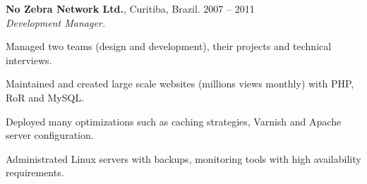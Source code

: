 \documentclass[margin,centered,10pt]{resume}
\begin{document}
\begin{resume}
    \textbf{No Zebra Network Ltd.}, Curitiba, Brazil.
    \hfill 2007 – 2011\\
    \textsl{Development Manager.}
    \vspace{-3mm}\\\vspace{-1mm}%
    \begin{list3}
    \item Managed two teams (design and development), their projects and technical interviews.
    \item Maintained and created large scale websites (millions views monthly) with PHP, RoR and MySQL. 
    \item Deployed many optimizations such as caching strategies, Varnish and Apache server configuration. 
    \item Administrated Linux servers with backups, monitoring tools with high availability requirements. 
    \end{list3}
    \vspace{-1.5mm}%


\end{resume}
\end{document}
